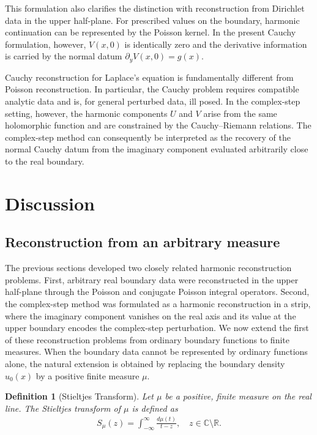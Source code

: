 \documentclass[11pt]{article}
\newtheorem{definition}{Definition}[section]
\begin{document}
This formulation also clarifies the distinction with reconstruction from Dirichlet data in the upper half-plane. For prescribed values on the boundary, harmonic continuation can be represented by the Poisson kernel. In the present Cauchy formulation, however, \(V(x,0)\) is identically zero and the derivative information is carried by the normal datum \(\partial_yV(x,0)=g(x)\).

Cauchy reconstruction for Laplace's equation is fundamentally different from Poisson reconstruction. In particular, the Cauchy problem requires compatible analytic data and is, for general perturbed data, ill posed. In the complex-step setting, however, the harmonic components $U$ and $V$ arise from the same holomorphic function and are constrained by the Cauchy--Riemann relations. The complex-step method can consequently be interpreted as the recovery of the normal Cauchy datum from the imaginary component evaluated arbitrarily close to the real boundary.



   \section{Discussion}
   
    
   \subsection{Reconstruction from an arbitrary measure}	
	
	The previous sections developed two closely related harmonic reconstruction problems. First, arbitrary real boundary data were reconstructed in the upper half-plane through the Poisson and conjugate Poisson integral operators. Second, the complex-step method was formulated as a harmonic reconstruction in a strip, where the imaginary component vanishes on the real axis and its value at the upper boundary encodes the complex-step perturbation. We now extend the first of these reconstruction problems from ordinary boundary functions to finite measures. When the boundary data cannot be represented by ordinary functions alone, the natural extension is obtained by replacing the boundary density \(u_0(x)\) by a positive finite measure \(\mu\).
%
	\begin{definition}[Stieltjes Transform]
		Let $\mu$ be a positive, finite measure on the real line. The \emph{Stieltjes transform} of $\mu$ is defined as \citep{anderson2010introduction,HirschmanWidder1955,WidderLaplaceTransform}
		\begin{align}
			S_{\mu}(z) =  \int_{-\infty}^{\infty} \frac{d\mu(t)}{t - z}, \quad z \in \mathbb{C} \setminus \mathbb{R}.
			\label{eq.Stieltjes_Transform}
		\end{align}
	\end{definition}
	
\end{document}
